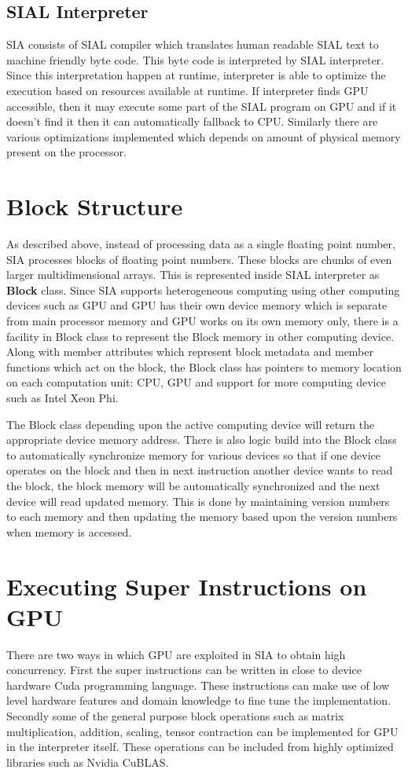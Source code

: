 \subsection{SIAL Interpreter}
SIA consists of SIAL compiler which translates human readable SIAL text to
machine friendly byte code. This byte code is interpreted by SIAL interpreter.
Since this interpretation happen at runtime, interpreter is able to optimize the
execution based on resources available at runtime. If interpreter finds GPU
accessible, then it may execute some part of the SIAL program on GPU and if it
doesn't find it then it can automatically fallback to CPU. Similarly there are
various optimizations implemented which depends on amount of physical memory
present on the processor.

\section{Block Structure}
As described above, instead of processing data as a single floating point
number, SIA processes blocks of floating point numbers. These blocks are chunks
of even larger multidimensional arrays. This is represented inside SIAL
interpreter as \textbf{Block} class. Since SIA supports heterogeneous computing
using other computing devices such as GPU and GPU has their own device memory
which is separate from main processor memory and GPU works on its own memory
only, there is a facility in Block class to represent the Block memory in other
computing device. Along with member attributes which represent block metadata
and member functions which act on the block, the Block class has pointers to
memory location on each computation unit: CPU, GPU and support for more
computing device such as Intel Xeon Phi.

The Block class depending upon the active computing device will return the
appropriate device memory address. There is also logic build into the Block
class to automatically synchronize memory for various devices so that if one
device operates on the block and then in next instruction another device wants
to read the block, the block memory will be automatically synchronized and the
next device will read updated memory. This is done by maintaining version numbers
to each memory and then updating the memory based upon the version numbers when
memory is accessed.

\section{Executing Super Instructions on GPU}
There are two ways in which GPU are exploited in SIA to obtain high concurrency.
First the super instructions can be written in close to device hardware Cuda
programming language. These instructions can make use of low level hardware
features and domain knowledge to fine tune the implementation. Secondly some of
the general purpose block operations such as matrix multiplication, addition,
scaling, tensor contraction can be implemented for GPU in the interpreter
itself. These operations can be included from highly optimized libraries such as
Nvidia CuBLAS.

